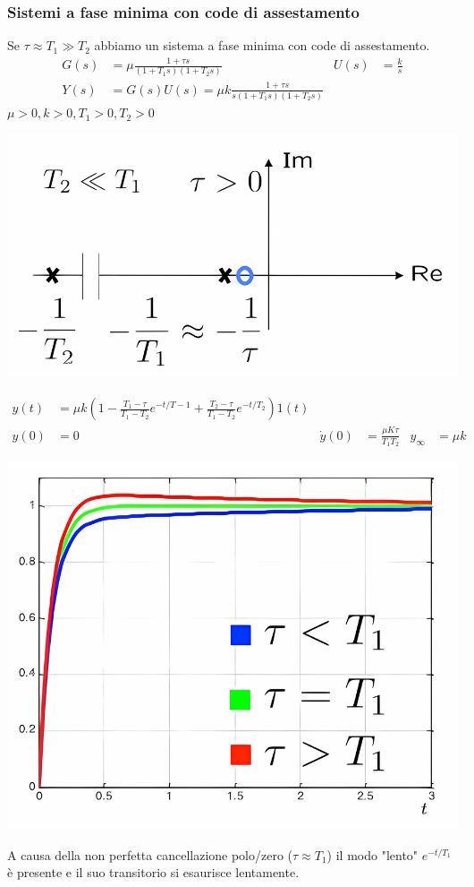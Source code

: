 \documentclass{article}
\numberwithin{equation}{subsection}
\begin{document}
\subsubsection{Sistemi a fase minima con code di assestamento}
Se  $\tau \approx T_1 \gg T_2$ abbiamo un sistema a fase minima con code di assestamento.
\begin{align*}
    G(s) &= \mu\frac{1 + \tau s}{(1+T_1s)(1+T_2s)} & U(s) &= \frac{k}{s}\\
    Y(s) &= G(s)U(s) = \mu k \frac{1+ \tau s}{s(1+T_1s)(1+T_2s)}
\end{align*}
$\mu>0,k>0,T_1>0,T_2>0$
\begin{center}
    \includegraphics[scale=0.215]{Images/Fase_minima_code_ass_1.png}
\end{center}
\begin{align*}
    y(t) &= \mu k \left( 1 - \frac{T_1-\tau}{T_1-T_2} e^{-t/T-1} + \frac{T_2-\tau}{T_1-T_2}e^{-t/T_2} \right)1(t)\\
    y(0) &= 0 & \dot y(0) &= \frac{\mu K \tau}{T_1T_2} & y_{\infty} &= \mu k
\end{align*}
\begin{center}
    \includegraphics[scale=0.2]{Images/Fase_minima_code_ass_2.png}
\end{center}
A causa della non perfetta cancellazione polo/zero ($\tau \approx T_1$) il modo "lento" $e^{-t/T_1}$ è presente e il suo transitorio si esaurisce lentamente.
\end{document}
